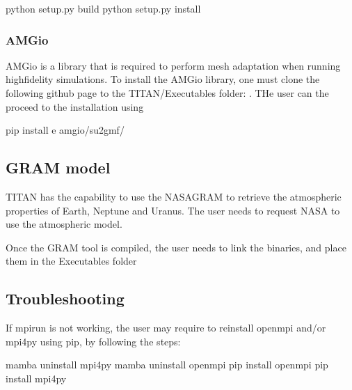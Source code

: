 \documentclass[letterpaper,10pt,english]{sphinxmanual}
\begin{document}
\begin{sphinxVerbatim}[commandchars=\\\{\}]
 python setup.py build
 python setup.py install
\end{sphinxVerbatim}


\subsubsection{AMGio}
\label{\detokenize{usage:amgio}}
\sphinxAtStartPar
AMGio is a library that is required to perform mesh adaptation when running high\sphinxhyphen{}fidelity simulations. To install the AMGio library, one must clone the following github page to the TITAN/Executables folder: . THe user can the proceed to the installation using

\begin{sphinxVerbatim}[commandchars=\\\{\}]
 pip install \PYGZhy{}e amgio/su2gmf/
\end{sphinxVerbatim}


\subsection{GRAM model}
\label{\detokenize{usage:gram-model}}
\sphinxAtStartPar
TITAN has the capability to use the NASA\sphinxhyphen{}GRAM  to retrieve the atmospheric properties of Earth, Neptune and Uranus. The user needs to request NASA to use the atmospheric model.

\sphinxAtStartPar
Once the GRAM tool is compiled, the user needs to link the binaries, and place them in the Executables folder


\subsection{Troubleshooting}
\label{\detokenize{usage:troubleshooting}}
\sphinxAtStartPar
If mpirun is not working, the user may require to reinstall openmpi and/or mpi4py using pip, by following the steps:

\begin{sphinxVerbatim}[commandchars=\\\{\}]
 mamba uninstall mpi4py
 mamba uninstall openmpi
 pip install openmpi
 pip install mpi4py
\end{sphinxVerbatim}
\end{document}

